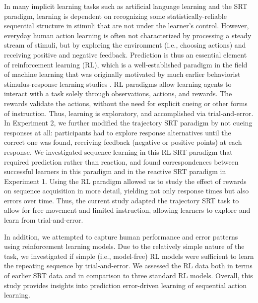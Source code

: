 \documentclass[man,floatsintext]{apa6}
\begin{document}
In many implicit learning tasks such as artificial language learning and the SRT paradigm, learning is dependent on recognizing some statistically-reliable sequential structure in stimuli that are not under the learner's control. However, everyday human action learning is often not characterized by processing a steady stream of stimuli, but by exploring the environment (i.e., choosing actions) and receiving positive and negative feedback. Prediction is thus an essential element of reinforcement learning (RL), which is a well-established paradigm in the field of machine learning \cite{Sutton:1998} that was originally motivated by much earlier behaviorist stimulus-response learning studies \cite{Skinner:1950}. RL paradigms allow learning agents to interact with a task solely through observations, actions, and rewards. The rewards validate the actions, without the need for explicit cueing or other forms of instruction. Thus, learning is exploratory, and accomplished via trial-and-error. In Experiment 2, we further modified the trajectory SRT paradigm by not cueing responses at all: participants had to explore response alternatives until the correct one was found, receiving feedback (negative or positive points) at each response. We investigated sequence learning in this RL SRT paradigm that required prediction rather than reaction, and found correspondences between successful learners in this paradigm and in the reactive SRT paradigm in Experiment 1. Using the RL paradigm allowed us to study the effect of rewards on sequence acquisition in more detail, yielding not only response times but also errors over time. Thus, the current study adapted the trajectory SRT task to allow for free movement and limited instruction, allowing learners to explore and learn from trial-and-error. 

In addition, we attempted to capture human performance and error patterns using reinforcement learning models. Due to the relatively simple nature of the task, we investigated if simple (i.e., model-free) RL models were sufficient to learn the repeating sequence by trial-and-error. We assessed the RL data both in terms of earlier SRT data and in comparison to three standard RL models. Overall, this study provides insights into prediction error-driven learning of sequential action learning. 
\end{document}

